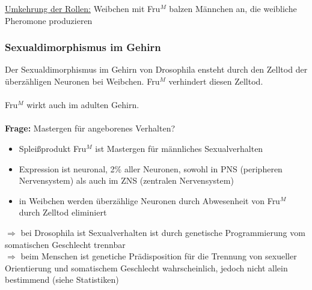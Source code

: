\underline{Umkehrung der Rollen:} Weibchen mit Fru$^M$ balzen Männchen an, die weibliche Pheromone produzieren

\subsubsection{Sexualdimorphismus im Gehirn}
Der Sexualdimorphismus im Gehirn von Drosophila ensteht durch den Zelltod der überzähligen Neuronen bei Weibchen. Fru$^M$ verhindert diesen Zelltod.
\\\\
Fru$^M$ wirkt auch im adulten Gehirn.
\\\\
\textbf{Frage:} Mastergen für angeborenes Verhalten?
\begin{itemize}
	\item Spleißprodukt Fru$^M$ ist Mastergen für männliches Sexualverhalten
	\item Expression ist neuronal, 2\% aller Neuronen, sowohl in PNS (peripheren Nervensystem) als auch im ZNS (zentralen Nervensystem)
	\item in Weibchen werden überzählige Neuronen durch Abwesenheit von Fru$^M$ durch Zelltod eliminiert
\end{itemize}

$\Rightarrow$ bei Drosophila ist Sexualverhalten ist durch genetische Programmierung vom somatischen Geschlecht trennbar\\
$\Rightarrow$ beim Menschen ist genetiche Prädisposition für die Trennung von sexueller Orientierung und somatischem Geschlecht wahrscheinlich, jedoch nicht allein bestimmend (siehe Statistiken)